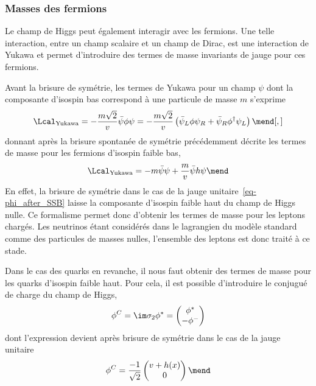 \subsubsection{Masses des fermions}\label{chapter-MS-MSSM-section-formalisme-subsec-Higgs_mechanism-subsubsec-fermions}
Le champ de Higgs peut également interagir avec les fermions. Une telle interaction, entre un champ scalaire et un champ de Dirac, est une interaction de Yukawa et permet d'introduire des termes de masse invariants de jauge pour ces fermions.
\par Avant la brisure de symétrie, les termes de Yukawa pour un champ $\psi$ dont la composante d'isospin bas correspond à une particule de masse $m$ s'exprime
\begin{equation}
\Lcal_\text{Yukawa}
= - \frac{m\sqrt{2}}{v} \bar{\psi} \phi \psi
= - \frac{m\sqrt{2}}{v} \left( \bar{\psi}_L \phi \psi_R + \bar{\psi}_R \phi^\dagger \psi_L \right)
\mend[,]
\end{equation}
donnant après la brisure spontanée de symétrie précédemment décrite les termes de masse pour les fermions d'isospin faible bas,
\begin{equation}
\Lcal_\text{Yukawa} = - m \bar{\psi}\psi + \frac{m}{v} \bar{\psi} h \psi
\mend
\end{equation}
En effet, la brisure de symétrie dans le cas de la jauge unitaire~\eqref{eq-phi_after_SSB} laisse la composante d'isospin faible haut du champ de Higgs nulle.
Ce formalisme permet donc d'obtenir les termes de masse pour les leptons chargés. Les neutrinos étant considérés dans le lagrangien du modèle standard comme des particules de masses nulles, l'ensemble des leptons est donc traité à ce stade.
\par Dans le cas des quarks en revanche, il nous faut obtenir des termes de masse pour les quarks d'isospin faible haut. Pour cela, il est possible d'introduire le conjugué de charge du champ de Higgs,
\begin{equation}
\phi^C = \im \sigma_2 \phi^* = \begin{pmatrix}
\phi^* \\ - \phi^-
\end{pmatrix}
\end{equation}
dont l'expression devient après brisure de symétrie dans le cas de la jauge unitaire
\begin{equation}
\phi^C =
\frac{-1}{\sqrt{2}}
\begin{pmatrix}
v+h(x)\\0
\end{pmatrix}
\mend
\end{equation}

